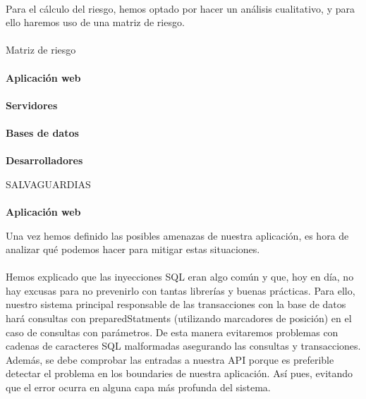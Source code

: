 \paragraph{}
Para el cálculo del riesgo, hemos optado por hacer un análisis
cualitativo, y para ello haremos uso de una matriz de riesgo.
\paragraph{}
Matriz de riesgo 
\paragraph{}
\textbf{Aplicación web}
\paragraph{}
\textbf{Servidores}
\paragraph{}
\textbf{Bases de datos}
\paragraph{}
\textbf{Desarrolladores}

SALVAGUARDIAS
\paragraph{}
\textbf{Aplicación web}

Una vez hemos definido las posibles amenazas de nuestra aplicación, es
hora de analizar qué podemos hacer para mitigar estas situaciones.
\paragraph{}
Hemos explicado que las inyecciones SQL eran algo común y que, hoy en
día, no hay excusas para no prevenirlo con tantas librerías y buenas
prácticas. Para ello, nuestro sistema principal responsable de las
transacciones con la base de datos hará consultas con
preparedStatments (utilizando marcadores de posición) en el caso de
consultas con parámetros. De esta manera evitaremos problemas con
cadenas de caracteres SQL malformadas asegurando las consultas y
transacciones. Además, se debe comprobar las entradas a nuestra API
porque es preferible detectar el problema en los boundaries de nuestra
aplicación. Así pues, evitando que el error ocurra en alguna capa más
profunda del sistema.
